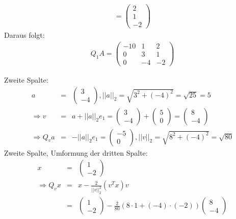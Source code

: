 \documentclass[11pt]{article} %
\begin{document}
\begin{enumerate}[a)]
\begin{eqnarray*}
= \begin{pmatrix}  2 \\ 1 \\ -2 \end{pmatrix}
\end{eqnarray*}
Daraus folgt:
\begin{eqnarray*}
Q_1A = \begin{pmatrix} -10 & 1 & 2\\ 0 & 3 & 1 \\ 0 & -4 &  -2 \end{pmatrix}
\end{eqnarray*}

Zweite Spalte:
\begin{eqnarray*}
a &=& \begin{pmatrix}3 \\ -4\end{pmatrix}, ||a||_2 = \sqrt{3^2 + (-4)^2} = \sqrt{25} = 5 \\
\Rightarrow v &=& a + ||a||_2e_1 = \begin{pmatrix}3 \\ -4 \end{pmatrix} + \begin{pmatrix} 5 \\ 0 \end{pmatrix} = \begin{pmatrix}  8 \\ -4 \end{pmatrix} \\
\Rightarrow Q_va &=& -||a||_2e_1 = \begin{pmatrix} -5 \\ 0 \end{pmatrix}, ||v||_2 = \sqrt{8^2 + (-4)^2} = \sqrt{80}
\end{eqnarray*}
Zweite Spalte, Umformung der dritten Spalte:
\begin{eqnarray*}
x &=& \begin{pmatrix} 1 \\ -2 \end{pmatrix} \\
\Rightarrow Q_vx &=& x - \frac 2 {||v||_2^2}(v^Tx)v \\
&=& \begin{pmatrix} 1 \\ -2 \end{pmatrix} - \frac 2 {80}(8\cdot 1 +  (-4)\cdot (-2))\begin{pmatrix}  8 \\ -4 \end{pmatrix} \\

\end{eqnarray*}
\end{enumerate}
\end{document}
